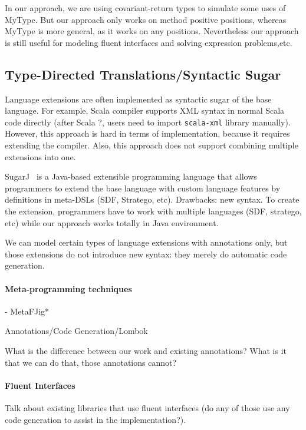 In our approach, we are using covariant-return types to simulate some uses of
MyType. But our approach only works on method positive positions, whereas MyType
is more general, as it works on any positions. Nevertheless our approach is
still useful for modeling fluent interfaces and solving expression
problems,etc. 

\subsection{Type-Directed Translations/Syntactic Sugar}
Language extensions are often implemented as syntactic sugar of the base
language. For example, Scala compiler supports XML syntax in normal Scala code
directly (after Scala ?, users need to import \texttt{scala-xml} library
manually). However, this approach is hard in terms of implementation, because it
requires extending the compiler. Also, this approach does not support combining
multiple extensions into one.

SugarJ~\cite{erdweg11sugarj} is a Java-based extensible programming language
that allows programmers to extend the base language with custom language
features by definitions in meta-DSLs (SDF, Stratego, etc). 
  Drawbacks: new
syntax. To create the extension, programmers have to work with multiple
languages (SDF, stratego, etc) while our approach works totally in Java
environment.

We can model certain types of language extensions with annotations 
only, but those extensions do not introduce new syntax: they 
merely do automatic code generation. 

\paragraph{Meta-programming techniques}
- MetaFJig*

Annotations/Code Generation/Lombok

What is the difference between our work and existing annotations? 
What is it that we can do that, those annotations cannot?

\paragraph{Fluent Interfaces}

Talk about existing libraries that use fluent interfaces (do any of 
those use any code generation to assist in the implementation?). 


